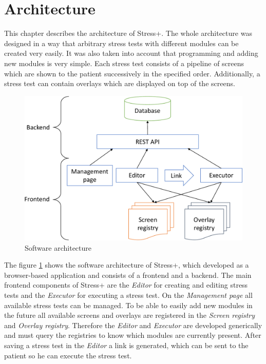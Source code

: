 \section{Architecture}
\label{sec:architecture}

This chapter describes the architecture of Stress+.
The whole architecture was designed in a way that arbitrary stress tests with different modules can be created very easily.
It was also taken into account that programming and adding new modules is very simple.
Each stress test consists of a pipeline of screens which are shown to the patient successively in the specified order.
Additionally, a stress test can contain overlays which are displayed on top of the screens.

\begin{figure}[htb]
  \centering
  \includegraphics[width=\textwidth]{figures/Architecture-crop}
  \caption{Software architecture}
  \label{fig:software-architecture}
\end{figure}

The figure \ref{fig:software-architecture} shows the software architecture of Stress+, which developed as a browser-based application and consists of a frontend and a backend.
The main frontend components of Stress+ are the \textit{Editor} for creating and editing stress tests and the \textit{Executor} for executing a stress test.
On the \textit{Management page} all available stress tests can be managed.
To be able to easily add new modules in the future all available screens and overlays are registered in the \textit{Screen registry} and \textit{Overlay registry}. 
Therefore the \textit{Editor} and \textit{Executor} are developed generically and must query the registries to know which modules are currently present.
After saving a stress test in the \textit{Editor} a link is generated, which can be sent to the patient so he can execute the stress test.

